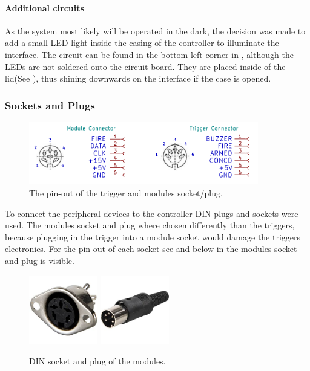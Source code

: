 \paragraph{Additional circuits}
As the system most likely will be operated in the dark, the decision was made to add a small LED light inside the casing of the controller to illuminate the interface. The circuit can be found in the bottom left corner in , although the LEDs are not soldered onto the circuit-board. They are placed inside of the lid(See ), thus shining downwards on the interface if the case is opened.

\subsubsection{Sockets and Plugs}
\label{Sockets and Plugs}

\begin{figure}[!ht]
    \centering
    \includegraphics[width=10cm]{./Figures/mod_trig_connector.png}
    \caption{The pin-out of the trigger and modules socket/plug.   }
    \label{fig:mod_trig_connector}     
\end{figure}



\noindent To connect the peripheral devices to the controller DIN plugs and sockets were used. The modules socket and plug where chosen differently than the triggers, because plugging in the trigger into a module socket would damage the triggers electronics. For the pin-out of each socket see  and below in  the modules socket and plug is visible.

\begin{figure}[!ht]
    \centering
    \includegraphics[width=3cm]{./Figures/MAB_5.jpg}
    \hspace{2cm}
    \includegraphics[width=3cm]{./Figures/MAS_50.jpg}
    \caption{DIN socket and plug of the modules.}
    \label{fig:din_plug_socket}     
\end{figure}

